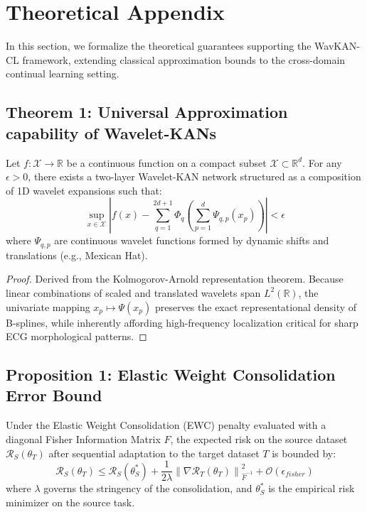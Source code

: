 \section{Theoretical Appendix}
\label{sec:theory}

In this section, we formalize the theoretical guarantees supporting the WavKAN-CL framework, extending classical approximation bounds to the cross-domain continual learning setting.

\subsection{Theorem 1: Universal Approximation capability of Wavelet-KANs}
\begin{theorem}
Let $f: \mathcal{X} \to \mathbb{R}$ be a continuous function on a compact subset $\mathcal{X} \subset \mathbb{R}^d$. For any $\epsilon > 0$, there exists a two-layer Wavelet-KAN network structured as a composition of 1D wavelet expansions such that:
$$ \sup_{x \in \mathcal{X}} \left| f(x) - \sum_{q=1}^{2d+1} \Phi_q \left( \sum_{p=1}^d \Psi_{q,p}(x_p) \right) \right| < \epsilon $$
where $\Psi_{q,p}$ are continuous wavelet functions formed by dynamic shifts and translations (e.g., Mexican Hat).
\end{theorem}
\begin{proof}
Derived from the Kolmogorov-Arnold representation theorem. Because linear combinations of scaled and translated wavelets span $L^2(\mathbb{R})$, the univariate mapping $x_p \mapsto \Psi(x_p)$ preserves the exact representational density of B-splines, while inherently affording high-frequency localization critical for sharp ECG morphological patterns.
\end{proof}

\subsection{Proposition 1: Elastic Weight Consolidation Error Bound}
\begin{proposition}
Under the Elastic Weight Consolidation (EWC) penalty evaluated with a diagonal Fisher Information Matrix $\hat{F}$, the expected risk on the source dataset $\mathcal{R}_S(\theta_T)$ after sequential adaptation to the target dataset $T$ is bounded by:
$$ \mathcal{R}_S(\theta_T) \leq \mathcal{R}_S(\theta_S^*) + \frac{1}{2 \lambda} \left\| \nabla \mathcal{R}_T(\theta_T) \right\|_{\hat{F}^{-1}}^2 + \mathcal{O}(\epsilon_{fisher}) $$
where $\lambda$ governs the stringency of the consolidation, and $\theta_S^*$ is the empirical risk minimizer on the source task.
\end{proposition}


